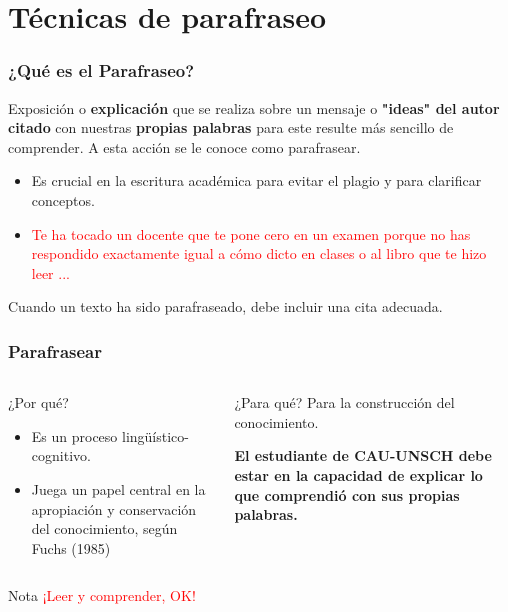 \documentclass[
11pt, %
]{beamer}
\begin{document}
\section{Técnicas de parafraseo}

\begin{frame}
	\frametitle{¿Qué es el Parafraseo?}
	\begin{definition}
		Exposición o \textbf{explicación} que se realiza sobre un mensaje o \textbf{"ideas" del autor citado} con nuestras \textbf{propias palabras} para este resulte más sencillo de comprender. A esta acción se le conoce como \alert{parafrasear}.
	\end{definition}

	\begin{itemize}
		\item Es crucial en la escritura académica para evitar el plagio y para clarificar conceptos.
		\item \textcolor{red}{Te ha tocado un docente que te pone cero en un examen porque no has respondido exactamente igual a cómo dicto en clases o al libro que te hizo leer ...}
	\end{itemize}

	Cuando un texto ha sido parafraseado, debe incluir una cita adecuada.
\end{frame}

\begin{frame}
	\frametitle{Parafrasear}

	\begin{columns}[c] %
		\begin{column}{0.45\textwidth} %
			\begin{block}{¿Por qué?}
				\begin{itemize}
					\item Es un proceso lingüístico-cognitivo.
					\item Juega un papel central en la apropiación y conservación del conocimiento, según Fuchs (1985)
				\end{itemize}
			\end{block}
		\end{column}
		\begin{column}{0.5\textwidth} %
			\begin{block}{¿Para qué?}
				Para la construcción del conocimiento.

				\textbf{El estudiante de CAU-UNSCH debe estar en la capacidad de explicar lo que comprendió con sus propias palabras.}
			\end{block}
		\end{column}
	\end{columns}
	\begin{alertblock}{Nota}
		\textcolor{red}{¡Leer y comprender, OK!}
	\end{alertblock}

\end{frame}
\end{document}
